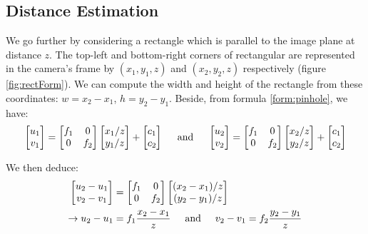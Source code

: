 \subsection{Distance Estimation}
We go further by considering a rectangle which is parallel to the image plane at distance $z$. The top-left and bottom-right corners of rectangular are represented in the camera's frame by $(x_1, y_1, z)$ and $(x_2, y_2, z)$ respectively (figure \ref{fig:rectForm}). We can compute the width and height of the rectangle from these coordinates: $w = x_2 - x_1$, $h = y_2 - y_1$. Beside, from formula \ref{form:pinhole}, we have:
\begin{align}
	\label{form:dist0}
	\begin{bmatrix}
		u_1 \\
		v_1
	\end{bmatrix} = \begin{bmatrix}
	f_1 & 0 \\
	0 & f_2 
\end{bmatrix} \begin{bmatrix}
x_1/z\\
y_1/z
\end{bmatrix} + \begin{bmatrix}
c_1 \\ c_2
\end{bmatrix}
\hspace{0.5cm} \text{and} \hspace{0.5cm}
	\begin{bmatrix}
		u_2 \\
		v_2
	\end{bmatrix} = \begin{bmatrix}
	f_1 & 0 \\
	0 & f_2 
\end{bmatrix} \begin{bmatrix}
x_2/z\\
y_2/z
\end{bmatrix} + \begin{bmatrix}
c_1 \\ c_2
\end{bmatrix}
\end{align}

We then deduce:
\begin{align}
	\begin{bmatrix}
		u_2 - u_1\\
		v_2 - v_1
	\end{bmatrix} &= \begin{bmatrix}
	f_1 & 0 \\
	0 & f_2 
\end{bmatrix} \begin{bmatrix}
(x_2 - x_1)/z\\
(y_2 - y_1)/z
\end{bmatrix} \nonumber\\
\label{form:dist1}
\rightarrow u_2 - u_1 &= f_1 \frac{x_2 - x_1}{z} \hspace{0.5cm} \text{and} \hspace{0.5cm} v_2 - v_1 = f_2 \frac{y_2 - y_1}{z} 
\end{align}


